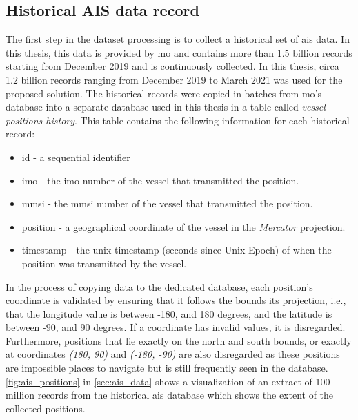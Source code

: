 \subsection{Historical AIS data record}

The first step in the dataset processing is to collect a historical set of \acrshort{ais} data. In this thesis, this data is provided by \acrfull{mo} and contains more than 1.5 billion records starting from December 2019 and is continuously collected. In this thesis, circa 1.2 billion records ranging from December 2019 to March 2021 was used for the proposed solution. The historical records were copied in batches from \acrshort{mo}'s database into a separate database used in this thesis in a table called \textit{vessel positions history}. This table contains the following information for each historical record:

\begin{itemize}
    \item id - a sequential identifier
    \item imo - the \acrshort{imo} number of the vessel that transmitted the position.
    \item mmsi - the \acrshort{mmsi} number of the vessel that transmitted the position.
    \item position - a geographical coordinate of the vessel in the \textit{Mercator} projection.
    \item timestamp - the unix timestamp (seconds since Unix Epoch) of when the position was transmitted by the vessel.
\end{itemize}

In the process of copying data to the dedicated database, each position's coordinate is validated by ensuring that it follows the bounds its projection, i.e., that the longitude value is between -180, and 180 degrees, and the latitude is between -90, and 90 degrees. If a coordinate has invalid values, it is disregarded. Furthermore, positions that lie exactly on the north and south bounds, or exactly at coordinates \textit{(180, 90)} and \textit{(-180, -90)} are also disregarded as these positions are impossible places to navigate but is still frequently seen in the database. \cref{fig:ais_positions} in \cref{sec:ais_data} shows a visualization of an extract of 100 million records from the historical \acrshort{ais} database which shows the extent of the collected positions.

